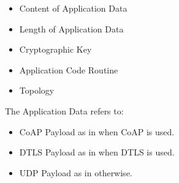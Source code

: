 \begin{itemize}
	\item Content of Application Data
	\item Length of Application Data
	\item Cryptographic Key
	\item Application Code Routine
	\item Topology
\end{itemize}

The Application Data refers to:
\begin{itemize}
	\item CoAP Payload as in  when CoAP is used.
	\item DTLS Payload as in  when DTLS is used.
	\item UDP Payload as in  otherwise.
\end{itemize}

%
%
%
%

